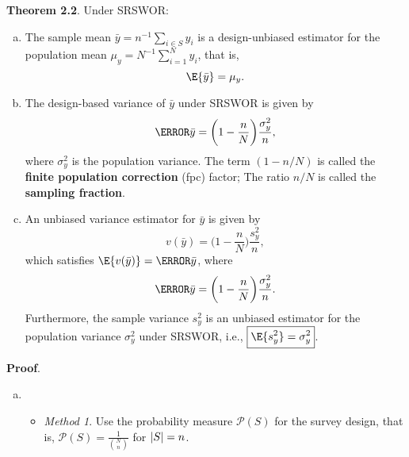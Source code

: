\begin{Result}{}
      \textbf{Theorem 2.2}. Under SRSWOR\@:
      \begin{enumerate}[(a)]
            \item The sample mean $ \bar{y}=n^{-1}\sum_{i\in S}y_i $
                  is a design-unbiased estimator for the population
                  mean $ \mu_y=N^{-1}\sum_{i=1}^{N}y_i $, that is,
                  \[ \E{\bar{y}}=\mu_y. \]
            \item The design-based variance of $ \bar{y} $
                  under SRSWOR is given by
                  \[ \V{\bar{y}}=\biggl(1-\frac{n}{N}\biggr)\frac{\sigma_y^2}{n}, \]
                  where $ \sigma_y^2 $ is the population variance. The term
                  $ (1-n/N) $ is called the \textbf{finite population correction} (fpc)
                  factor; The ratio $ n/N $ is called the \textbf{sampling fraction}.
            \item An unbiased variance estimator for $ \bar{y} $ is given by
                  \[ v(\bar{y})=\biggl(1-\frac{n}{N}\biggr)\frac{s_y^2}{n}, \]
                  which satisfies
                  $ \E{v(\bar{y})}=\V{\bar{y}} $,
                  where
                  \[ \V{\bar{y}}=\biggl(1-\frac{n}{N}\biggr)\frac{\sigma_y^2}{n}. \]
                  Furthermore, the sample variance $ s_y^2 $ is an unbiased estimator for the
                  population variance $ \sigma_y^2 $ under SRSWOR, i.e.,
                  $ \boxed{\E{s_y^2}=\sigma_y^2} $.
      \end{enumerate}
      \tcblower{}
      \textbf{Proof}.
      \begin{enumerate}[(a)]
            \item \begin{itemize}
                        \item \emph{Method 1}. Use the probability measure $ \mathcal{P}(S) $
                              for the survey design, that is, $ \mathcal{P}(S)=\frac{1}{\binom{N}{n}} $
                              for $ \lvert S\rvert=n $.


\end{itemize}
\end{enumerate}
\end{Result}
